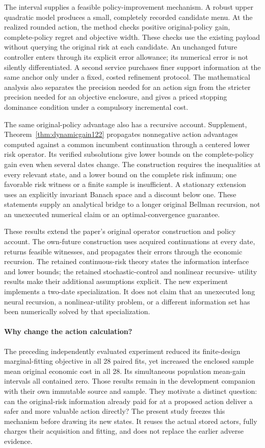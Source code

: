 The interval supplies a feasible policy-improvement mechanism. A robust upper
quadratic model produces a small, completely recorded candidate menu. At the
realized rounded action, the method checks positive original-policy gain,
complete-policy regret and objective width. These checks use the existing
payload without querying the original risk at each candidate. An unchanged
future controller enters through its explicit error allowance; its numerical
error is not silently differentiated. A second service purchases finer support
information at the same anchor only under a fixed, costed refinement protocol.
The mathematical analysis also separates the precision needed for an action
sign from the stricter precision needed for an objective enclosure, and gives
a priced stopping dominance condition under a compulsory incremental cost.

The same original-policy advantage also has a recursive account.
Supplement, Theorem~\ref{thm:dynamicgain122} propagates nonnegative action
advantages computed against a common incumbent continuation through a
centered lower risk operator. Its verified subsolutions give lower bounds on
the complete-policy gain even when several dates change. The construction
requires the inequalities at every relevant state, and a lower bound on the
complete risk infimum; one favorable risk witness or a finite sample is
insufficient. A stationary extension uses an explicitly invariant Banach
space and a discount below one. These statements supply an analytical bridge
to a longer original Bellman recursion, not an unexecuted numerical claim
or an optimal-convergence guarantee.

These results extend the paper's original operator construction and policy
account. The own-future construction uses acquired continuations at every date,
returns feasible witnesses, and propagates their errors through the economic
recursion. The retained continuous-risk theory states the information interface
and lower bounds; the retained stochastic-control and nonlinear recursive-
utility results make their additional assumptions explicit. The new experiment
implements a two-date specialization. It does not claim that an unexecuted long
neural recursion, a nonlinear-utility problem, or a different information set has
been numerically solved by that specialization.

\paragraph{Why change the action calculation?}
The preceding independently evaluated experiment reduced its finite-design
marginal-fitting objective in all 28 paired fits, yet increased the enclosed
sample mean original economic cost in all 28. Its simultaneous population
mean-gain intervals all contained zero. Those results remain in the development
companion with their own immutable source and sample. They motivate a distinct
question: can the original-risk information already paid for at a proposed
action deliver a safer and more valuable action directly? The present study
freezes this mechanism before drawing its new states. It reuses the actual
stored actors, fully charges their acquisition and fitting, and does not
replace the earlier adverse evidence.

